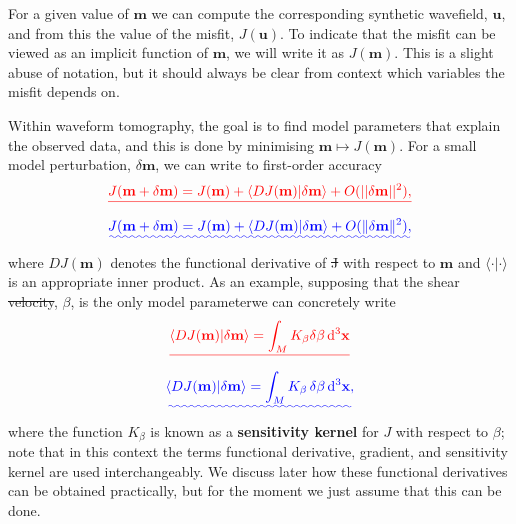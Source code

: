 \documentclass[a4paper,12pt]{paper}
\providecommand{\DIFadd}[1]{{\protect\color{blue}\uwave{#1}}} %
\providecommand{\DIFdel}[1]{{\protect\color{red}\sout{#1}}}                      %
\providecommand{\DIFaddbegin}{} %
\providecommand{\DIFaddend}{} %
\providecommand{\DIFdelbegin}{} %
\providecommand{\DIFdelend}{} %
\begin{document}
 For a given value of $\mathbf{m}$ we can 
 compute the corresponding synthetic wavefield, $\mathbf{u}$, and from this the value of the misfit, $J(\mathbf{u})$. To indicate that 
 the misfit can be viewed as an implicit function of $\mathbf{m}$, we will write it as $J(\mathbf{m})$. This is a slight abuse of notation, 
 but it should always be clear from context which variables the misfit depends on.

Within waveform tomography, the goal is to find model parameters that explain the observed data, and this is done by 
minimising $\mathbf{m}\mapsto J(\mathbf{m})$. For a small model perturbation, $\delta \mathbf{m}$, we can write to first-order accuracy
\DIFdelbegin \begin{displaymath}
\DIFdel{J(\mathbf{m}+\delta \mathbf{m})=J(\mathbf{m})+\langle DJ(\mathbf{m})|\delta \mathbf{m}\rangle+O(||\delta \mathbf{m}||^{2}),
}\end{displaymath}%
\DIFdelend \DIFaddbegin \begin{equation}
\DIFadd{J(\mathbf{m}+\delta \mathbf{m})=J(\mathbf{m})+\langle DJ(\mathbf{m})|\delta \mathbf{m}\rangle+O(\|\delta \mathbf{m}\|^{2}),
\label{eq:2}
}\end{equation}\DIFaddend 
where $DJ(\mathbf{m})$ denotes the functional derivative of \DIFdelbegin \DIFdel{J }\DIFdelend \DIFaddbegin \DIFadd{$J$ }\DIFaddend with respect to $\mathbf{m}$ and $\langle \cdot | \cdot \rangle$ is an 
appropriate inner product. As an example, supposing that the shear \DIFdelbegin \DIFdel{velocity}\DIFdelend \DIFaddbegin \DIFadd{wave speed}\DIFaddend , $\beta$, is the only model parameter\DIFaddbegin \DIFadd{, }\DIFaddend we can concretely write
\DIFdelbegin \begin{displaymath}
\DIFdel{\langle DJ(\mathbf{m})|\delta \mathbf{m}\rangle=\int_{M}K_{\beta}\delta\beta\dd^{3}\mathbf{x}
}\end{displaymath}%
\DIFdelend \DIFaddbegin \begin{equation}
\DIFadd{\langle DJ(\mathbf{m})|\delta \mathbf{m}\rangle=\int_{M}K_{\beta}\,\delta\beta\dd^{3}\mathbf{x},
\label{eq:3}
}\end{equation}\DIFaddend 
where the function $K_{\beta}$ is known as a \textbf{sensitivity kernel} for $J$ with respect to $\beta$; 
note that in this context the terms functional derivative, gradient, and sensitivity kernel are used interchangeably.
We discuss later how these functional derivatives can be obtained practically, but for the moment we just assume that this can be done.
\end{document}
